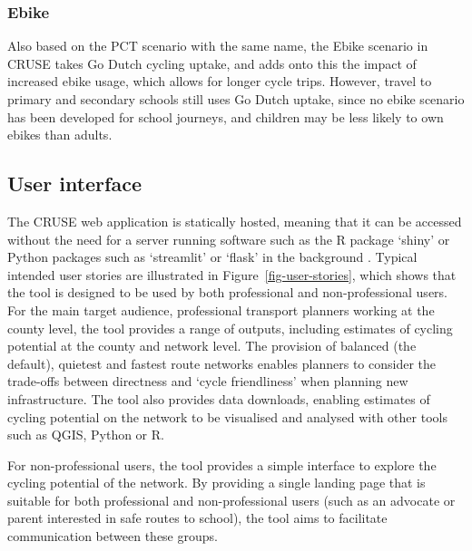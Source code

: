\documentclass[
  super,
  preprint,
  3p]{elsarticle}
\begin{document}
\hypertarget{ebike}{%
\subsubsection{Ebike}\label{ebike}}

Also based on the PCT scenario with the same name, the Ebike scenario in
CRUSE takes Go Dutch cycling uptake, and adds onto this the impact of
increased ebike usage, which allows for longer cycle trips. However,
travel to primary and secondary schools still uses Go Dutch uptake,
since no ebike scenario has been developed for school journeys, and
children may be less likely to own ebikes than adults.

\hypertarget{sec-ui}{%
\subsection{User interface}\label{sec-ui}}

The CRUSE web application is statically hosted, meaning that it can be
accessed without the need for a server running software such as the R
package `shiny' or Python packages such as `streamlit' or `flask' in the
background \citep{wickham2021}. Typical intended user stories are
illustrated in Figure~\ref{fig-user-stories}, which shows that the tool
is designed to be used by both professional and non-professional users.
For the main target audience, professional transport planners working at
the county level, the tool provides a range of outputs, including
estimates of cycling potential at the county and network level. The
provision of balanced (the default), quietest and fastest route networks
enables planners to consider the trade-offs between directness and
`cycle friendliness' when planning new infrastructure. The tool also
provides data downloads, enabling estimates of cycling potential on the
network to be visualised and analysed with other tools such as QGIS,
Python or R.

For non-professional users, the tool provides a simple interface to
explore the cycling potential of the network. By providing a single
landing page that is suitable for both professional and non-professional
users (such as an advocate or parent interested in safe routes to
school), the tool aims to facilitate communication between these groups.
\end{document}
